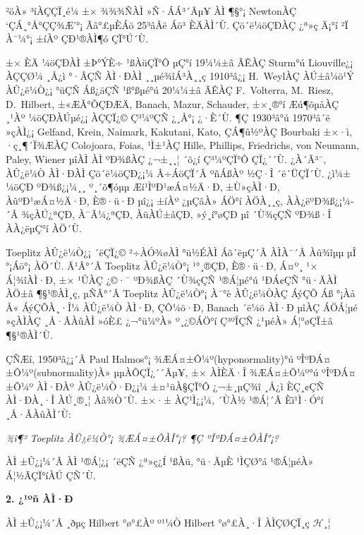 \documentclass[12pt,a4paper,2sided]{article}
\begin{document}
\noindent ²öÀ» ³íÀÇÇÏ¸é¼­ ±× ¾¾¾ÑÀÌ »Ñ·ÁÁ³´Âµ¥ ÀÌ ¶§°¡ NewtonÀÇ
`ÇÁ¸°Å°ÇÇ¾Æ'°¡ Ãâ°£µÈÁö 25³âÂë Áö³­ ÈÄÀÌ´Ù. Çö´ë¼öÇÐÀÇ ¿ª»ç Ä¡°í ²Ï
À¯¼­°¡ ±íÀº ÇÐ¹®ÀÌ¶ó ÇÏ°Ú´Ù.

  ±× ÈÄ ¼öÇÐÀÌ ±Þ°ÝÈ÷ ¹ßÀüÇÏ°Ô µÇ°í 19¼¼±â ÃÊÀÇ
Sturm°ú Liouville¿¡ ÀÇÇØ¼­ ¸Å¿ì °­·ÂÇÑ ÀÌ·ÐÀÌ ¸¸µé¾îÁ³À¸¸ç 1910³â¿¡
H.\ WeylÀÇ ÀÚ±â¼ö¹Ý ÀÛ¿ë¼Ò¿¡ °üÇÑ Áß¿äÇÑ ¹ß°ßµé°ú 20¼¼±â ÃÊÀÇ F.\
Volterra, M.\ Riesz, D.\ Hilbert, ±«ÆÃ°ÕÇÐÆÄ, Banach, Mazur,
Schauder, ±×¸®°í Æú¶õµåÀÇ ¸¹Àº ¼öÇÐÀÚµé¿¡ ÀÇÇÏ¿© Ç³¼ºÇÑ ¿­¸Å°¡
¿­·È´Ù. ¶Ç 1930³â°ú 1970³â´ë »çÀÌ¿¡ Gelfand, Krein, Naimark,
Kakutani, Kato, ÇÁ¶û½ºÀÇ Bourbaki ±×·ì, ·ç¸¶´Ï¾ÆÀÇ Colojoara, Foias,
¹Ì±¹ÀÇ Hille, Phillips, Friedrichs, von Neumann, Paley, Wiener µîÀÌ
ÀÌ ºÐ¾ßÀÇ ¿¬±¸¸¦ ´õ¿í Ç³¼ºÇÏ°Ô ÇÏ¿´´Ù. ¿À´Ã³¯, ÀÛ¿ë¼Ò ÀÌ·ÐÀÌ
Çö´ë¼öÇÐ¿¡¼­ Â÷ÁöÇÏ´Â ºñÁßÀº ½Ç·Î ´ë´ÜÇÏ´Ù. ¿ì¼± ¼öÇÐ ºÐ¾ß¿¡¼­¸¸
º¸´õ¶óµµ Æí¹ÌºÐ¹æÁ¤½Ä·Ð, ±Ù»çÀÌ·Ð, ÀûºÐ¹æÁ¤½Ä·Ð, È®·ü·Ð µî¿¡ ±íÀº
¿µÇâÀ» ÁÖ°í ÀÖÀ¸¸ç, ÀÀ¿ëºÐ¾ß¿¡¼­´Â ¾çÀÚ¿ªÇÐ, À¯Ã¼¿ªÇÐ, ÀüÀÚ±âÇÐ,
»ý¸í°øÇÐ µî ´Ù¾çÇÑ ºÐ¾ß·Î ÀÀ¿ëµÇ°í ÀÖ´Ù.

Toeplitz ÀÛ¿ë¼Ò¿¡ ´ëÇÏ¿© ²÷ÀÓ¾øÀÌ °ü½ÉÀÌ Áõ´ëµÇ´Â ÀÌÀ¯´Â Àû¾îµµ µÎ
°¡Áö°¡ ÀÖ´Ù. Ã¹Â°´Â Toeplitz ÀÛ¿ë¼Ò°¡ ¹°¸®ÇÐ, È®·ü·Ð, Á¤º¸ ¹×
Á¦¾îÀÌ·Ð, ±× ¹ÛÀÇ ¿©·¯ ºÐ¾ßÀÇ ´Ù¾çÇÑ ¹®Á¦µé°ú ¹ÐÁ¢ÇÑ °ü·ÃÀÌ ÀÖ±â
¶§¹®ÀÌ¸ç, µÑÂ°´Â Toeplitz ÀÛ¿ë¼Ò°¡ À¯°è ÀÛ¿ë¼ÒÀÇ ÁýÇÕ Áß °¡Àå Å«
ÁýÇÕÀ¸·Î¼­ ÀÛ¿ë¼Ò ÀÌ·Ð, ÇÔ¼ö·Ð, Banach ´ë¼ö ÀÌ·Ð µîÀÇ ÁÖÁ¦µé »çÀÌÀÇ
¸Å·ÂÀûÀÎ »óÈ£ ¿¬°ü¼ºÀ» º¸¿©ÁÖ°í Ç³ºÎÇÑ ¿¹µéÀ» Á¦°øÇÏ±â ¶§¹®ÀÌ´Ù.

ÇÑÆí, 1950³â¿¡´Â Paul Halmos°¡ ¾ÆÁ¤±Ô¼º(hyponormality)°ú
ºÎºÐÁ¤±Ô¼º\newline\noindent(subnormality)À» µµÀÔÇÏ¿´´Âµ¥, ±× ÀÌÈÄ·Î
¾ÆÁ¤±Ô¼º°ú ºÎºÐÁ¤±Ô¼º ÀÌ·ÐÀº ÀÛ¿ë¼Ò·Ð¿¡¼­ ±¤¹üÀ§ÇÏ°Ô ¿¬±¸µÇ¾î ¸Å¿ì
ÈÇ¸¢ÇÑ ÀÌ·ÐÀ¸·Î ÀÚ¸®¸¦ Àâ¾Ò´Ù. ±×·± ÀÇ¹Ì¿¡¼­, ´ÙÀ½ ¹®Á¦´Â Èï¹Ì·Ó°í
¸Å·ÂÀûÀÌ´Ù:

\vspace{.2 cm}\centerline {\it ¾î¶² Toeplitz ÀÛ¿ë¼Ò°¡ ¾ÆÁ¤±ÔÀÎ°¡? ¶Ç
ºÎºÐÁ¤±ÔÀÎ°¡?}\vspace{.2 cm}

ÀÌ ±Û¿¡¼­´Â ÀÌ ¹®Á¦¿¡ ´ëÇÑ ¿ª»ç¿Í ¹ßÀü, °ü·ÃµÈ ¹ÌÇØ°á ¹®Á¦µéÀ»
Á¦½ÃÇÏ°íÀÚ ÇÑ´Ù.



\vspace{.8 cm} {\large\bf 2. ¿¹ºñ ÀÌ·Ð}

\vspace{.5 cm}

ÀÌ  ±Û¿¡¼­´Â ¸ðµç Hilbert °ø°£Àº º¹¼Ò Hilbert °ø°£À¸·Î ÀÌÇØÇÏ¸ç
$\mathcal{H}$¸¦\linebreak
\end{document}
